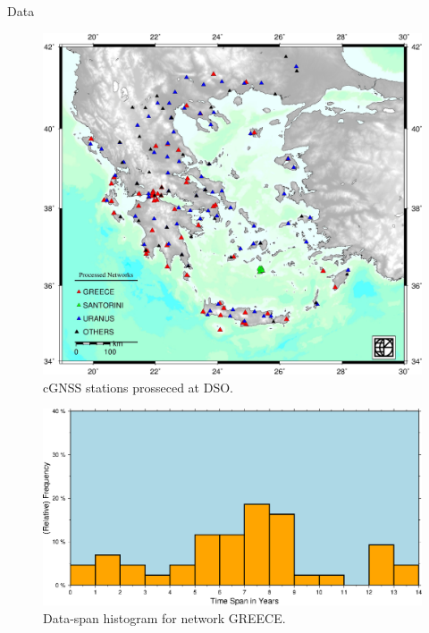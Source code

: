 \documentclass[final,a0,portrait]{beamer}
\newlength{\onecolwid}
\begin{document}
\begin{frame}[t]
\begin{columns}[t]
\begin{column}{\onecolwid}
\begin{block}{Data}
{%
}
\begin{figure}
  \centering
  \includegraphics[width=0.75\onecolwid]{grnets.jpg}
  \caption{cGNSS stations prosseced at DSO.}
  \label{fig:grnets}
\end{figure}
\begin{figure}
    \centering
    \includegraphics[width=.7\linewidth,height=.07\paperheight]{greece-freqs.png}
    \caption{Data-span histogram for network GREECE.}
    \label{fig:grfreq}
\end{figure}
\end{block}


\end{column}
\end{columns}
\end{frame}
\end{document}
